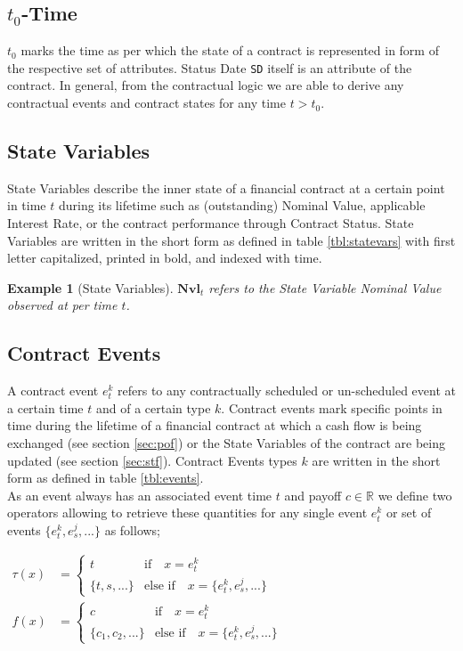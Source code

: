 \documentclass[9pt,oneside]{amsart}
\newtheorem{example}{Example}
\newcommand{\Real}{\mathbb{R}}
\newcommand{\svar}[2]{\textbf{#1}_{#2}}
\newcommand{\attr}[1]{\texttt{#1}}
\newcommand{\tev}[1]{\tau(#1)}
\newcommand{\fev}[1]{f(#1)}
\begin{document}
\begin{multicols}{2}
\subsection{$t_0$-Time}

$t_0$ marks the time as per which the state of a contract is represented in form of the respective set of attributes. Status Date \attr{SD} itself is an attribute of the contract. In general, from the contractual logic we are able to derive any contractual events and contract states for any time $t>t_0$.


\subsection{State Variables}

State Variables describe the inner state of a financial contract at a certain point in time $t$ during its lifetime such as (outstanding) Nominal Value, applicable Interest Rate, or the contract performance through Contract Status. State Variables are written in the short form as defined in table \ref{tbl:statevars} with first letter capitalized, printed in bold, and indexed with time.

\begin{example}[State Variables]
$\svar{Nvl}{t}$ refers to the State Variable \textit{Nominal Value} observed at per time $t$.
\end{example}


\subsection{Contract Events}

A contract event $e_t^k$ refers to any contractually scheduled or un-scheduled event at a certain time $t$ and of a certain type $k$. Contract events mark specific points in time during the lifetime of a financial contract at which a cash flow is being exchanged (see section \ref{sec:pof}) or the State Variables of the contract are being updated (see section \ref{sec:stf}). Contract Events types $k$ are written in the short form as defined in table \ref{tbl:events}.\\

As an event always has an associated event time $t$ and payoff $c\in\Real$ we define two operators allowing to retrieve these quantities for any single event $e_t^k$ or set of events $\{e_t^k,e_s^j, ...\}$ as follows;

{$\begin{aligned} 
	\tev{x} &= \begin{cases} t & \text{if}\quad x=e_t^k \\
				\{t,s,...\} & \text{else if}\quad x=\{e_t^k,e_s^j,...\} \end{cases} \\
	\fev{x} &= \begin{cases} c & \text{if}\quad x=e_t^k \\
				\{c_1, c_2, ...\} & \text{else if}\quad x=\{e_t^k,e_s^j,...\} \end{cases}
\end{aligned}$}


\end{multicols}
\end{document}
